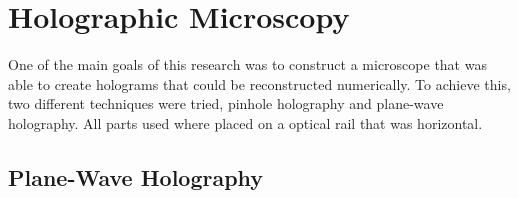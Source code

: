 %
%

\chapter{Holographic Microscopy} \label{chap:Micro}

One of the main goals of this research was to construct a microscope that was
able to create holograms that could be reconstructed numerically. To achieve
this, two different techniques were tried, pinhole holography and plane-wave
holography. All parts used where placed on a
optical rail that was horizontal.

%
%
%

\section{Plane-Wave Holography}

